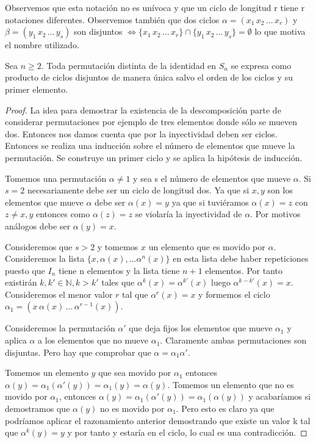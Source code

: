 Observemos que esta notación no es unívoca y que un ciclo de longitud r tiene r notaciones diferentes. Observemos también que dos ciclos $\alpha = (x_1 \, x_2 \, ... \, x_r)$ y $\beta = (y_1 \, x_2 \, ... \, y_s)$ son disjuntos $\iff \{x_1 \, x_2 \, ... \, x_r \} \cap \{y_1 \, x_2 \, ... \, y_s \} = \emptyset$ lo que motiva el nombre utilizado.

\begin{theorem}
Sea $n \ge 2$. Toda permutación distinta de la identidad en $S_n$ se expresa como producto de ciclos disjuntos de manera única salvo el orden de los ciclos y su primer elemento.
\end{theorem}

\begin{proof}
La idea para demostrar la existencia de la descomposición parte de considerar permutaciones por ejemplo de tres elementos donde sólo se mueven dos. Entonces nos damos cuenta que por la inyectividad deben ser ciclos. Entonces se realiza una inducción sobre el número de elementos que mueve la permutación. Se construye un primer ciclo y se aplica la hipótesis de inducción.

Tomemos una permutación $\alpha \neq 1$ y sea s el número de elementos que mueve $\alpha$. Si $s = 2$ necesariamente debe ser un ciclo de longitud dos. Ya que si $x,y$ son los elementos que mueve $\alpha$ debe ser $\alpha(x) = y$ ya que si tuviéramos $\alpha(x) = z$ con $z \neq x,y$ entonces como $\alpha(z) = z$ se violaría la inyectividad de $\alpha$. Por motivos análogos debe ser $\alpha(y) = x$.

Consideremos que $s > 2$ y tomemos $x$ un elemento que es movido por $\alpha$. Consideremos la lista $\{x,\alpha(x),...\alpha^n(x)\}$ en esta lista debe haber repeticiones puesto que $I_n$ tiene n elementos y la lista tiene $n+1$ elementos. Por tanto existirán $k,k' \in \mathbb{N}, k > k'$ tales que $\alpha^{k}(x) = \alpha^{k'}(x)$ luego $\alpha^{k-k'}(x) = x$. Consideremos el menor valor $r$ tal que $\alpha^r(x) = x$ y formemos el ciclo $\alpha_1 = (x \, \alpha(x) \, ...  \, \alpha^{r-1}(x))$.

Consideremos la permutación $\alpha'$ que deja fijos los elementos que mueve $\alpha_1$ y aplica $\alpha$ a los elementos que no mueve $\alpha_1$. Claramente  ambas permutaciones son disjuntas. Pero hay que comprobar que $\alpha = \alpha_1 \alpha'$.

Tomemos un elemento $y$ que sea movido por $\alpha_1$ entonces $\alpha(y) = \alpha_1(\alpha'(y)) = \alpha_1(y) = \alpha(y)$. Tomemos un elemento que no es movido por $\alpha_1$, entonces $\alpha(y) = \alpha_1(\alpha'(y)) = \alpha_1(\alpha(y))$ y acabaríamos si demostramos que $\alpha(y)$ no es movido por $\alpha_1$. Pero esto es claro ya que podríamos aplicar el razonamiento anterior demostrando que existe un valor k tal que $\alpha^k(y) = y$ y por tanto y estaría en el ciclo, lo cual es una contradicción.


\end{proof}

